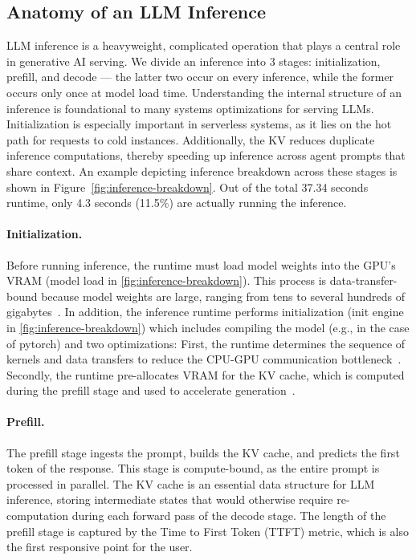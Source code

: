 \subsection{Anatomy of an LLM Inference}

LLM inference is a heavyweight, complicated operation that plays a central role in generative AI serving. 
We divide an inference into 3 stages: initialization, prefill, and decode --- the latter two occur on every inference, while the former occurs only once at model load time.
Understanding the internal structure of an inference is foundational to many systems optimizations for serving LLMs.
Initialization is especially important in serverless systems, as it lies on the hot path for requests to cold instances.
Additionally, the KV reduces duplicate inference computations, thereby speeding up inference across agent prompts that share context.
An example depicting inference breakdown across these stages is shown in Figure~\ref{fig:inference-breakdown}. Out of the total 37.34 seconds runtime, only 4.3 seconds (11.5\%) are actually running the inference.



\paragraph{Initialization.}
Before running inference, the runtime must load model weights into the GPU's VRAM (model load in \autoref{fig:inference-breakdown}). 
This process is data-transfer-bound because model weights are large, ranging from tens to several hundreds of gigabytes~\cite{models}.
In addition, the inference runtime performs initialization (init engine in \autoref{fig:inference-breakdown}) which includes compiling the model (e.g., in the case of pytorch) and two optimizations:
First, the runtime determines the sequence of kernels and data transfers to reduce the CPU-GPU communication bottleneck~\cite{vllm, medusa}.
Secondly, the runtime pre-allocates VRAM for the KV cache, which is computed during the prefill stage and used to accelerate generation~\cite{vllm}.

\paragraph{Prefill.}
The prefill stage ingests the prompt, builds the KV cache, and predicts the first token of the response.
This stage is compute-bound, as the entire prompt is processed in parallel.
The KV cache is an essential data structure for LLM inference, storing intermediate states that would otherwise require re-computation during each forward pass of the decode stage.
The length of the prefill stage is captured by the Time to First Token (TTFT) metric, which is also the first responsive point for the user. 

